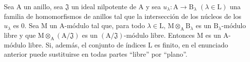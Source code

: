 \begin{theorem}[11.4.1]
\label{IV.11.4.1}
Sea $\mathrm{A}$ un anillo, sea $\mathfrak{J}$ un ideal nilpotente de $\mathrm{A}$ y sea $u_\lambda:\mathrm{A}\to\mathrm{B}_\lambda$ $(\lambda\in\mathrm{L})$
una familia de homomorfismos de anillos tal que la intersección de los núcleos de los $u_\lambda$ es $0$.
Sea $\mathrm{M}$ un $\mathrm{A}$-módulo tal que, para todo $\lambda\in\mathrm{L}$, $\mathrm{M}\otimes_\mathrm{A}\mathrm{B}_\lambda$ es un $\mathrm{B}_\lambda$-módulo libre y que $\mathrm{M}\otimes_\mathrm{A}(\mathrm{A}/\mathfrak{J})$
es un $(\mathrm{A}/\mathfrak{J})$-módulo libre. Entonces $\mathrm{M}$ es un $\mathrm{A}$-módulo libre. Si, además, el conjunto de índices $\mathrm{L}$ es
finito, en el enunciado anterior puede sustituirse en todas partes ``libre'' por ``plano''.
\end{theorem}

